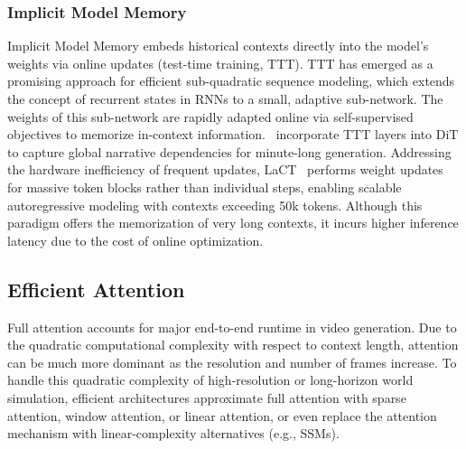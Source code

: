 \documentclass[lettersize,journal]{IEEEtran}
\begin{document}
\subsubsection{Implicit Model Memory}
Implicit Model Memory embeds historical contexts directly into the model's weights via online updates (test-time training, TTT). TTT\cite{sun2025learning} has emerged as a promising approach for efficient sub-quadratic sequence modeling, which extends the concept of recurrent states in RNNs to a small, adaptive sub-network. The weights of this sub-network are rapidly adapted online via self-supervised objectives to memorize in-context information.~\cite{dalal2025one} incorporate TTT layers into DiT to capture global narrative dependencies for minute-long generation. Addressing the hardware inefficiency of frequent updates, LaCT~\cite{zhang2025test} performs weight updates for massive token blocks rather than individual steps, enabling scalable autoregressive modeling with contexts exceeding 50k tokens. Although this paradigm offers the memorization of very long contexts, it incurs higher inference latency due to the cost of online optimization.



\subsection{Efficient Attention}
Full attention accounts for major end-to-end runtime in video generation. Due to the quadratic computational complexity with respect to context length, attention can be much more dominant as the resolution and number of frames increase.
To handle this quadratic complexity of high-resolution or long-horizon world simulation, efficient architectures approximate full attention with sparse attention, window attention, or linear attention, or even replace the attention mechanism with linear-complexity alternatives (e.g., SSMs).
\end{document}
